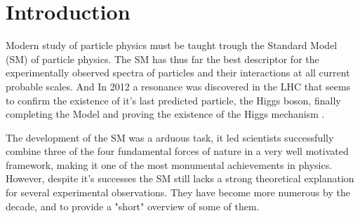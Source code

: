 
\newpage

\chapter{Introduction}


Modern study of particle physics must be taught trough the Standard Model (SM) of particle physics. 
%
The SM has thus far the best descriptor for the experimentally observed spectra of particles and their interactions at all current probable scales. 
%
And In 2012 a resonance was discovered in the LHC that seems to confirm the existence of it's last predicted particle, the Higgs boson, finally completing the Model and proving the existence of the Higgs mechanism \cite{Aad_2012,chatrchyan2012observation,
collaborations2015combined,collaborations2016measurements}. 

The development of the SM was a arduous task, it led scientists successfully  combine three of the four fundamental forces of nature in a very well motivated framework, making it one of the most monumental achievements in physics.
%
However, despite it's successes the SM still lacks a strong theoretical explanation for several experimental observations. They have become more numerous by the decade, and to provide a "short" overview of some of them. 

